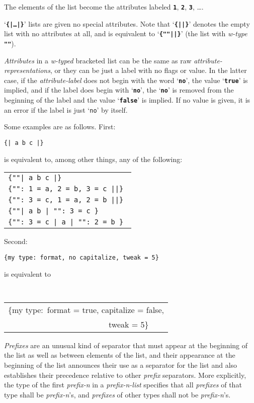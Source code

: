 \documentclass[12pt]{article}
\newcommand{\TT}[1]{{\tt \bfseries #1}}
\begin{document}
The elements of the
list become the attributes labeled \TT{1}, \TT{2}, \TT{3}, \ldots.

`\TT{\{|\ldots|\}}' lists are given no special attributes.
Note that `\TT{\{||\}}' denotes the empty list with no attributes
at all, and is equivalent to `\TT{\{""||\}}' (the list with {\em w-type}
\TT{""}).

{\em Attributes} in a {\em w-typed} bracketed list can be the same as
raw {\em attribute-representations}, or they can be just a label with
no flags or value.  In the latter case, if
the {\em attribute-label} does not begin with the word `\TT{no}',
the value `\TT{true}' is implied, and if the label does begin with
`\TT{no}', the `\TT{no}' is removed from the beginning of the label
and the value `\TT{false}' is implied.
If no value is given, it is an error if the label is just
`{\tt no}' by itself.

Some examples are as follows.  First:
\begin{center}
\tt \{| a b c |\}
\end{center}
is equivalent to, among other things, any of the following:
\begin{center}
\begin{tabular}{l}
\tt \{""| a b c |\} \\
\tt \{"":~1 = a, 2 = b, 3 = c ||\} \\
\tt \{"":~3 = c, 1 = a, 2 = b ||\} \\
\tt \{""| a b | "":~3 = c \} \\
\tt \{"":~3 = c | a | "":~2 = b \}
\end{tabular}
\end{center}

Second:

\begin{center}
\tt \{my type:~format, no capitalize, tweak = 5\}
\end{center}
is equivalent to
\begin{center}
\tt
\begin{tabular}{@{}l@{}}
\{my type:~format = true, capitalize = false, \\
~~~~~~~~~~~~~~~~~~~~~~~~~tweak = 5\} \\
\end{tabular}
\end{center}

{\em Prefixes} are an unusual kind of separator
that must appear at the beginning of the list as well as between
elements of the list, and their appearance at the beginning of the list
announces their use as a separator for the list and also establishes their
precedence relative to other {\em prefix} separators.
More explicitly, the type of the first {\em prefix-n} in a {\em prefix-n-list}
specifies that all {\em prefixes} of that type shall be {\em prefix-n}'s,
and {\em prefixes} of other types shall not be {\em prefix-n}'s.
\end{document}
